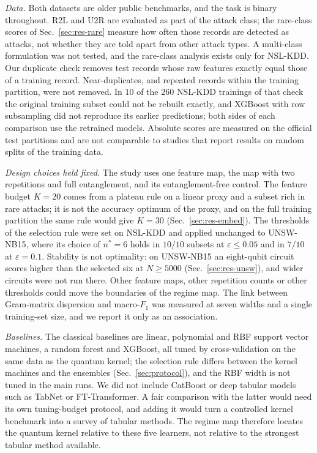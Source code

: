 \emph{Data.} Both datasets are older public benchmarks, and the task is binary throughout. R2L
and U2R are evaluated as part of the attack class; the rare-class scores of
Sec.~\ref{sec:res-rare} measure how often those records are detected as attacks, not whether
they are told apart from other attack types. A multi-class formulation was not tested, and the
rare-class analysis exists only for NSL-KDD. Our duplicate check removes test records whose raw
features exactly equal those of a training record. Near-duplicates, and repeated records within
the training partition, were not removed. In $10$ of the $260$ NSL-KDD trainings of that
check the original training subset could not be rebuilt exactly, and XGBoost with row
subsampling did not reproduce its earlier predictions; both sides of each comparison use the
retrained models. Absolute scores are measured on the official test
partitions and are not comparable to studies that report results on random splits of the
training data.

\emph{Design choices held fixed.} The study uses one feature map, the \ZZ{} map with two
repetitions and full entanglement, and its entanglement-free control. The feature budget $K=20$
comes from a plateau rule on a linear proxy and a subset rich in rare attacks; it is not the
accuracy optimum of the proxy, and on the full training partition the same rule would give
$K=30$ (Sec.~\ref{sec:res-embed}). The thresholds of the selection rule were
set on NSL-KDD and applied unchanged to UNSW-NB15, where its choice of $n^{\ast}=6$ holds in
$10/10$ subsets at $\varepsilon\le0.05$ and in $7/10$ at $\varepsilon=0.1$. Stability is not
optimality: on UNSW-NB15 an eight-qubit circuit scores higher than the selected six at
$N\ge5000$ (Sec.~\ref{sec:res-unsw}), and wider circuits were not run there. Other feature maps,
other repetition counts or other thresholds could move the boundaries of the regime map. The
link between Gram-matrix dispersion and macro-$F_1$ was measured at seven widths and a single
training-set size, and we report it only as an association.

\emph{Baselines.} The classical baselines are linear, polynomial and RBF support vector
machines, a random forest and XGBoost, all tuned by cross-validation on the same data as the quantum kernel;
the selection rule differs between the kernel machines and the ensembles
(Sec.~\ref{sec:protocol}), and the RBF width is not tuned in the main runs.
We did not include CatBoost or deep tabular models such as TabNet or FT-Transformer. A fair comparison with the latter
would need its own tuning-budget protocol, and adding it would turn a controlled kernel
benchmark into a survey of tabular methods. The regime map therefore locates the quantum kernel
relative to these five learners, not relative to the strongest tabular method available.
